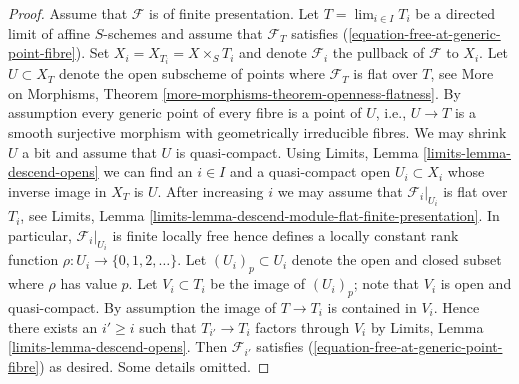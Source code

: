 \begin{proof}
\medskip\noindent
Assume that $\mathcal{F}$ is of finite presentation.
Let $T = \lim_{i \in I} T_i$ be a directed limit of affine $S$-schemes
and assume that $\mathcal{F}_T$ satisfies
(\ref{equation-free-at-generic-point-fibre}).
Set $X_i = X_{T_i} = X \times_S T_i$ and denote $\mathcal{F}_i$ the
pullback of $\mathcal{F}$ to $X_i$.
Let $U \subset X_T$ denote the open subscheme of points where
$\mathcal{F}_T$ is flat over $T$, see
More on Morphisms, Theorem \ref{more-morphisms-theorem-openness-flatness}.
By assumption every generic point of every fibre is a point of $U$, i.e.,
$U \to T$ is a smooth surjective morphism with geometrically irreducible
fibres. We may shrink $U$ a bit and assume that $U$ is quasi-compact.
Using
Limits, Lemma \ref{limits-lemma-descend-opens}
we can find an $i \in I$ and a quasi-compact open $U_i \subset X_i$
whose inverse image in $X_T$ is $U$. After increasing $i$ we may
assume that $\mathcal{F}_i|_{U_i}$ is flat over $T_i$, see
Limits, Lemma \ref{limits-lemma-descend-module-flat-finite-presentation}.
In particular, $\mathcal{F}_i|_{U_i}$ is finite locally free
hence defines a locally constant
rank function $\rho : U_i \to \{0, 1, 2, \ldots \}$.
Let $(U_i)_p \subset U_i$ denote the open and closed
subset where $\rho$ has value $p$. Let $V_i \subset T_i$ be the
image of $(U_i)_p$; note that $V_i$ is open and quasi-compact.
By assumption the image of $T \to T_i$ is contained in $V_i$.
Hence there exists an $i' \geq i$ such that $T_{i'} \to T_i$ factors
through $V_i$ by
Limits, Lemma \ref{limits-lemma-descend-opens}.
Then $\mathcal{F}_{i'}$ satisfies (\ref{equation-free-at-generic-point-fibre})
as desired. Some details omitted.
\end{proof}

